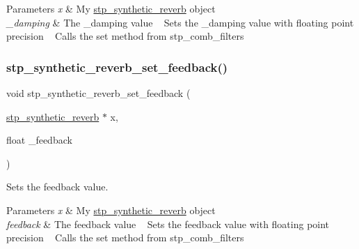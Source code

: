 \begin{DoxyParams}{Parameters}
{\em x} & My \hyperlink{structstp__synthetic__reverb}{stp\+\_\+synthetic\+\_\+reverb} object ~\newline
 \\
\hline
{\em \+\_\+damping} & The \+\_\+damping value ~\newline
 Sets the \+\_\+damping value with floating point precision ~\newline
 Calls the set method from stp\+\_\+comb\+\_\+filters ~\newline
 \\
\hline
\end{DoxyParams}
\mbox{\label{structstp__synthetic__reverb_a694e51a0e4f29ccc542ea24ec8ce7dd9}} 
\subsubsection{\texorpdfstring{stp\+\_\+synthetic\+\_\+reverb\+\_\+set\+\_\+feedback()}{stp\_synthetic\_reverb\_set\_feedback()}}
{\footnotesize\ttfamily void stp\+\_\+synthetic\+\_\+reverb\+\_\+set\+\_\+feedback (\begin{DoxyParamCaption}\item[{\hyperlink{structstp__synthetic__reverb}{stp\+\_\+synthetic\+\_\+reverb} $\ast$}]{x,  }\item[{float}]{\+\_\+feedback }\end{DoxyParamCaption})\hspace{0.3cm}{\ttfamily [related]}}



Sets the feedback value. ~\newline
 


\begin{DoxyParams}{Parameters}
{\em x} & My \hyperlink{structstp__synthetic__reverb}{stp\+\_\+synthetic\+\_\+reverb} object ~\newline
 \\
\hline
{\em feedback} & The feedback value ~\newline
 Sets the feedback value with floating point precision ~\newline
 Calls the set method from stp\+\_\+comb\+\_\+filters ~\newline
 \\
\hline
\end{DoxyParams}


